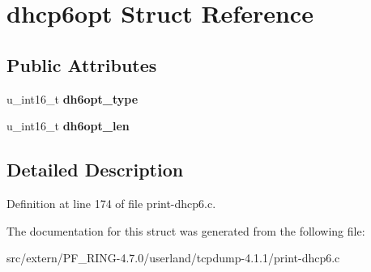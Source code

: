 \hypertarget{structdhcp6opt}{
\section{dhcp6opt Struct Reference}
\label{structdhcp6opt}
}
\subsection*{Public Attributes}
\begin{DoxyCompactItemize}
\item 
\hypertarget{structdhcp6opt_a27cc16c8edc6b6b5a1aec9696c420211}{
u\_\-int16\_\-t {\bfseries dh6opt\_\-type}}
\label{structdhcp6opt_a27cc16c8edc6b6b5a1aec9696c420211}

\item 
\hypertarget{structdhcp6opt_af6d55bdae86a65dbfb1cf1d616a9adc0}{
u\_\-int16\_\-t {\bfseries dh6opt\_\-len}}
\label{structdhcp6opt_af6d55bdae86a65dbfb1cf1d616a9adc0}

\end{DoxyCompactItemize}


\subsection{Detailed Description}


Definition at line 174 of file print-\/dhcp6.c.



The documentation for this struct was generated from the following file:\begin{DoxyCompactItemize}
\item 
src/extern/PF\_\-RING-\/4.7.0/userland/tcpdump-\/4.1.1/print-\/dhcp6.c\end{DoxyCompactItemize}

